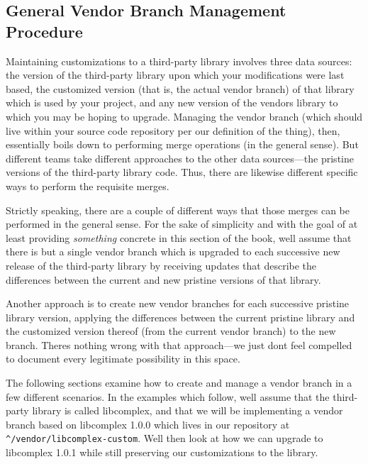 \subsection{General Vendor Branch Management
Procedure}\label{svn.advanced.vendorbr.general}

Maintaining customizations to a third-party library involves three data
sources: the version of the third-party library upon which your
modifications were last based, the customized version (that is, the
actual vendor branch) of that library which is used by your project, and
any new version of the vendor\textquotesingle s library to which you may
be hoping to upgrade. Managing the vendor branch (which should live
within your source code repository per our definition of the thing),
then, essentially boils down to performing merge operations (in the
general sense). But different teams take different approaches to the
other data sources---the pristine versions of the third-party library
code. Thus, there are likewise different specific ways to perform the
requisite merges.

Strictly speaking, there are a couple of different ways that those
merges can be performed in the general sense. For the sake of simplicity
and with the goal of at least providing \emph{something} concrete in
this section of the book, we\textquotesingle ll assume that there is but
a single vendor branch which is upgraded to each successive new release
of the third-party library by receiving updates that describe the
differences between the current and new pristine versions of that
library.

Another approach is to create new vendor branches for each successive
pristine library version, applying the differences between the current
pristine library and the customized version thereof (from the current
vendor branch) to the new branch. There\textquotesingle s nothing wrong
with that approach---we just don\textquotesingle t feel compelled to
document every legitimate possibility in this space.

The following sections examine how to create and manage a vendor branch
in a few different scenarios. In the examples which follow,
we\textquotesingle ll assume that the third-party library is called
libcomplex, and that we will be implementing a vendor branch based on
libcomplex 1.0.0 which lives in our repository at
\texttt{\^{}/vendor/libcomplex-custom}. We\textquotesingle ll then look
at how we can upgrade to libcomplex 1.0.1 while still preserving our
customizations to the library.

